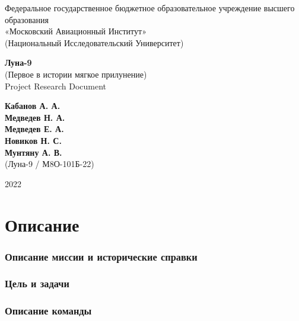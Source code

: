 


\begin{titlepage}
	\begin{center}
		\Large
		Федеральное  государственное бюджетное образовательное учреждение высшего образования \\
		«Московский Авиационный Институт»\\
		(Национальный Исследовательский Университет)
		
		
		\vspace{1.5cm}
		
		\huge
		\textbf{Луна-9} \\ 
		\Large
		(Первое в истории мягкое прилунение) \\
		\LARGE
		Project Research Document
		
		\vspace{1.5cm}
		
		\textbf{Кабанов А. А.} \\
		\textbf{Медведев Н. А.} \\
		\textbf{Медведев Е. А.} \\
		\textbf{Новиков Н. С.} \\
		\textbf{Мунтяну А. В.} \\
		\vspace{1cm}
		\Large
		(Луна-9 / М8О-101Б-22)
		
		\vspace{3cm}
		2022
	\end{center}
\end{titlepage}
\newpage
\section{Описание}
\subsubsection{Описание миссии и исторические справки}
	
\subsubsection{Цель и задачи}

\subsubsection{Описание команды}
